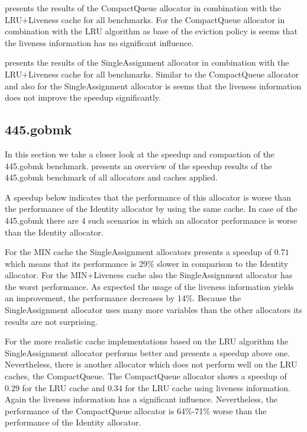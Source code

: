 \documentclass[onecolumn, openright, master, english, signatures]{dbrgrptt}
\begin{document}
 presents the results of the CompactQueue allocator in combination with the \ac{LRU}+Liveness cache for all benchmarks.
For the CompactQueue allocator in combination with the \ac{LRU} algorithm as base of the eviction policy is seems that the liveness information has no significant influence.

 presents the results of the SingleAssignment allocator in combination with the \ac{LRU}+Liveness cache for all benchmarks.
Similar to the CompactQueue allocator and also for the SingleAssignment allocator is seems that the liveness information does not improve the speedup significantly.

\subsection{445.gobmk}

In this section we take a closer look at the speedup and compaction of the 445.gobmk benchmark.
 presents an overview of the speedup results of the 445.gobmk benchmark of all allocators and caches applied.

A speedup below indicates that the performance of this allocator is worse than the performance of the Identity allocator by using the same cache.
In case of the 445.gobmk there are 4 such scenarios in which an allocator performance is worse than the Identity allocator.

For the \ac{MIN} cache the SingleAssignment allocators presents a speedup of $0.71$ which means that its performance is 29\% slower in comparison to the Identity allocator.
For the \ac{MIN}+Liveness cache also the SingleAssignment allocator has the worst performance.
As expected the usage of the liveness information yields an improvement, the performance decreases by 14\%.
Because the SingleAssignment allocator uses many more variables than the other allocators its results are not surprising.

For the more realistic cache implementations based on the \ac{LRU} algorithm the SingleAssignment allocator performs better and presents a speedup above one.
Nevertheless, there is another allocator which does not perform well on the \ac{LRU} caches, the CompactQueue.
The CompactQueue allocator shows a speedup of $0.29$ for the \ac{LRU} cache and $0.34$ for the \ac{LRU} cache using liveness information.
Again the liveness information has a significant influence.
Nevertheless, the performance of the CompactQueue allocator is 64\%-71\% worse than the performance of the Identity allocator.
\end{document}
